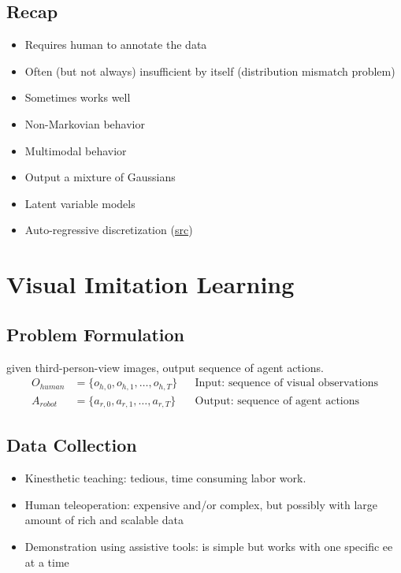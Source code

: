 \subsection{Recap}
\begin{itemize}
	\item Requires human to annotate the data
	\item Often (but not always) insufficient by itself (distribution mismatch problem)
	\item Sometimes works well
\end{itemize}
\begin{itemize}
	\item Non-Markovian behavior
	\item Multimodal behavior
\end{itemize}
\begin{itemize}
	\item Output a mixture of Gaussians
	\item Latent variable models
	\item Auto-regressive discretization (\href{https://www.youtube.com/watch?v=988gLurg01U&list=PL_iWQOsE6TfURIIhCrlt-wj9ByIVpbfGc&index=7}{src})
\end{itemize}

\section{Visual Imitation Learning}
\subsection{Problem Formulation}
 given third-person-view images, output sequence of agent actions.
\begin{align}
	O_{human} &= \{ o_{h,0}, o_{h,1}, \dots, o_{h,T} \} && \text{Input: sequence of visual observations}\\
	A_{robot} &= \{ a_{r,0}, a_{r,1}, \dots, a_{r,T} \} && \text{Output: sequence of agent actions}
\end{align}

\subsection{Data Collection}

\begin{itemize}
	\item Kinesthetic teaching: tedious, time consuming labor work. \cite{tykal2016incrementally}
	\item Human teleoperation: expensive and/or complex, but possibly with large amount of rich and scalable data \cite{zhang2018deep}
	\item Demonstration using assistive tools: is simple but works with one specific \ac{ee} at a time \cite{young2020visual}
\end{itemize}

